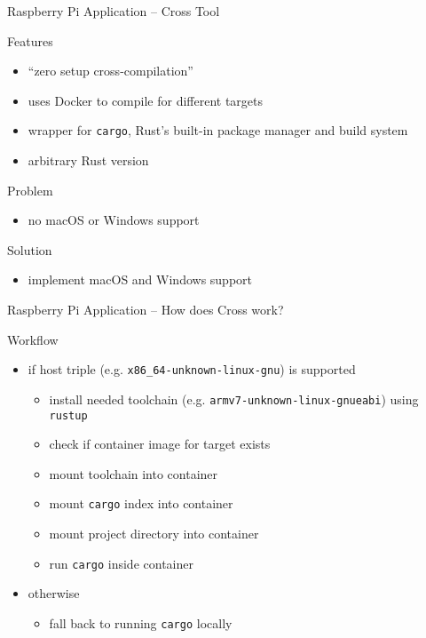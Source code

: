 \documentclass[aspectratio=169]{beamer}
\newcommand\green[1]{{\color{green(ncs)}#1}}
\newcommand\red[1]{{\color{amaranth}#1}}
\begin{document}
  \begin{frame}{Raspberry Pi Application -- Cross Tool}
    \begin{block}{Features}
      \begin{itemize}
        \item “zero setup cross-compilation”
        \item uses Docker to compile for different targets
        \item wrapper for \texttt{cargo}, Rust's built-in package manager and build system
        \item arbitrary Rust version
      \end{itemize}
    \end{block}

     {
    \begin{block}{\red{Problem}}
      \begin{itemize}
        \item no macOS or Windows support
      \end{itemize}
    \end{block}
    }

     {
    \begin{block}{\green{Solution}}
      \begin{itemize}
        \item implement macOS and Windows support
      \end{itemize}
    \end{block}
    }
  \end{frame}

  \begin{frame}{Raspberry Pi Application -- How does Cross work?}
    \begin{block}{Workflow}
       \begin{itemize}
         \item if host triple (e.g. \texttt{x86\_64-unknown-linux-gnu}) is supported
           \begin{itemize}
            \item install needed toolchain (e.g. \texttt{armv7-unknown-linux-gnueabi}) using \texttt{rustup}
            \item check if container image for target exists
            \item mount toolchain into container
            \item mount \texttt{cargo} index into container
            \item mount project directory into container
            \item run \texttt{cargo} inside container
           \end{itemize}
         \item otherwise
           \begin{itemize}
             \item fall back to running \texttt{cargo} locally
           \end{itemize}
      \end{itemize}
    \end{block}
  \end{frame}
\end{document}
